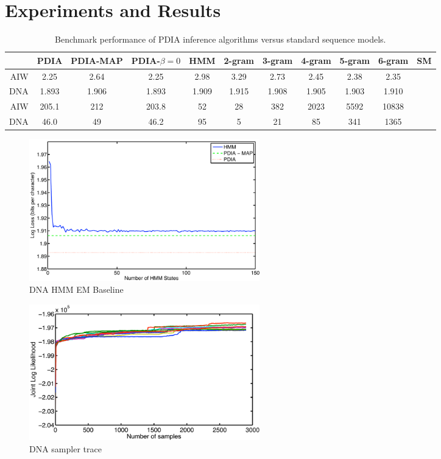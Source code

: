 \section{Experiments and Results}


\begin{table}[t]
    \begin{center}
    \setlength{\tabcolsep}{1.3mm}
\begin{tabular}{r|cccccccccc}
\hline
& {\bf PDIA } & PDIA-MAP & PDIA-$\beta=0$ & HMM & 2-gram& 3-gram & 4-gram & 5-gram & 6-gram & SM \\
\hline
AIW & 2.25 & 2.64 & 2.25 & 2.98 & 3.29 & 2.73 & 2.45 & 2.38 & 2.35 &\\
DNA & 1.893 & 1.906 & 1.893 & 1.909 & 1.915 & 1.908 & 1.905 & 1.903 & 1.910 & \\
\hline
\hline
AIW & 205.1 & 212 & 203.8 & 52 & 28 & 382 & 2023 & 5592 & 10838 &\\
DNA & 46.0 & 49 & 46.2 & 95 & 5 & 21 & 85 & 341 & 1365 & \\
\hline
\end{tabular}
\end{center}
\caption[Short]{Benchmark performance of PDIA inference algorithms versus standard sequence models.}
\label{table:results}
\end{table}

\begin{figure}[htbp]
\begin{center}
\includegraphics[width=10cm]{results/dna_hmm}
\caption{DNA HMM EM Baseline}
\label{fig:dna_hmm}
\end{center}
\end{figure}

\begin{figure}[htbp]
\begin{center}
\includegraphics[width=10cm]{results/dna_sampler}
\caption{DNA sampler trace }
\label{fig:dna_sampler}
\end{center}
\end{figure}

